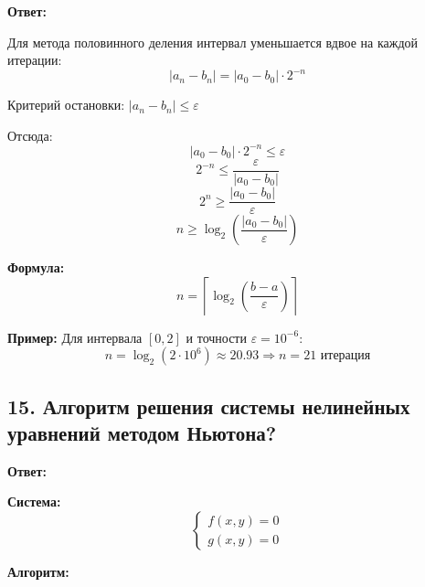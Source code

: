 \documentclass[a4paper,12pt]{article}
\begin{document}
\textbf{Ответ:} 

Для метода половинного деления интервал уменьшается вдвое на каждой итерации:
\[
    |a_n - b_n| = |a_0 - b_0| \cdot 2^{-n}
\]

Критерий остановки: $|a_n - b_n| \leq \varepsilon$

Отсюда:
\[
    |a_0 - b_0| \cdot 2^{-n} \leq \varepsilon
\]
\[
    2^{-n} \leq \frac{\varepsilon}{|a_0 - b_0|}
\]
\[
    2^{n} \geq \frac{|a_0 - b_0|}{\varepsilon}
\]
\[
    n \geq \log_2 \left( \frac{|a_0 - b_0|}{\varepsilon} \right)
\]

\textbf{Формула:}
\[
    n = \left\lceil \log_2 \left( \frac{b - a}{\varepsilon} \right) \right\rceil
\]

\textbf{Пример:} Для интервала $[0, 2]$ и точности $\varepsilon = 10^{-6}$:
\[
    n = \log_2(2 \cdot 10^6) \approx 20.93 \Rightarrow n = 21 \text{ итерация}
\]

\subsection*{15. Алгоритм решения системы нелинейных уравнений методом Ньютона?}

\textbf{Ответ:} 

\textbf{Система:}
\[
\begin{cases}
f(x, y) = 0 \\
g(x, y) = 0
\end{cases}
\]

\textbf{Алгоритм:}
\end{document}
